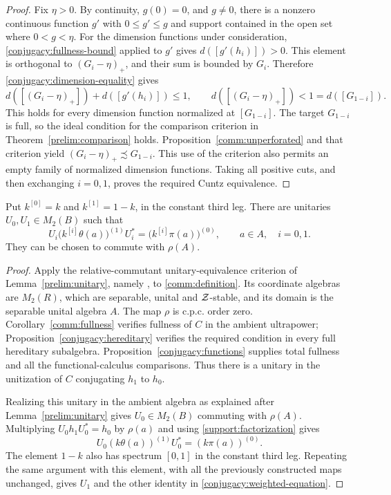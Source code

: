 \begin{proof}
Fix $\eta>0$.  By continuity, $g(0)=0$, and $g\ne0$, there is
a nonzero continuous function $g'$ with $0\leq g'\leq g$ and
support contained in the open set where $0<g<\eta$.
For the dimension functions under consideration,
\eqref{conjugacy:fullness-bound} applied to $g'$ gives
$d([g'(h_i)])>0$.  This element is orthogonal to
$(G_i-\eta)_+$, and their sum is bounded by $G_i$.
Therefore \eqref{conjugacy:dimension-equality} gives
\[
 d([(G_i-\eta)_+])+d([g'(h_i)])\leq1,
 \qquad
 d([(G_i-\eta)_+])<1=d([G_{1-i}]).
\]
This holds for every dimension function normalized at
$[G_{1-i}]$.  The target $G_{1-i}$ is full, so the ideal condition
for the comparison criterion in Theorem~\ref{prelim:comparison} holds.
Proposition~\ref{comm:unperforated} and that criterion yield
$(G_i-\eta)_+\precsim G_{1-i}$.  This use of the criterion
also permits an empty family of normalized dimension functions.
Taking all positive cuts, and then exchanging $i=0,1$, proves
the required Cuntz equivalence.
\end{proof}

\begin{proposition}\label{conjugacy:weighted}
Put $k^{[0]}=k$ and $k^{[1]}=1-k$, in the constant third leg.
There are unitaries $U_0,U_1\in M_2(B)$ such that
\begin{equation}\label{conjugacy:weighted-equation}
 U_i\bigl(k^{[i]}\theta(a)\bigr)^{(1)}U_i^*
   =\bigl(k^{[i]}\pi(a)\bigr)^{(0)},
 \qquad a\in A,\quad i=0,1.
\end{equation}
They can be chosen to commute with $\rho(A)$.
\end{proposition}

\begin{proof}
Apply the relative-commutant unitary-equivalence criterion of
Lemma~\ref{prelim:unitary}, namely \cite[Lemma~5.3]{BBSTWW}, to
\eqref{comm:definition}.  Its coordinate algebras are $M_2(R)$,
which are separable, unital and $\mathcal Z$-stable, and its domain is the
separable unital algebra $A$.  The map $\rho$ is c.p.c. order
zero.  Corollary~\ref{comm:fullness} verifies fullness of $C$ in
the ambient ultrapower; Proposition~\ref{conjugacy:hereditary}
verifies the required condition in every full hereditary
subalgebra.  Proposition~\ref{conjugacy:functions} supplies total
fullness and all the functional-calculus comparisons.  Thus there
is a unitary in the unitization of $C$ conjugating $h_1$ to $h_0$.

Realizing this unitary in the ambient algebra as explained after
Lemma~\ref{prelim:unitary} gives $U_0\in M_2(B)$ commuting with
$\rho(A)$. Multiplying
$U_0h_1U_0^*=h_0$ by $\rho(a)$ and using
\eqref{support:factorization} gives
\[
 U_0(k\theta(a))^{(1)}U_0^*=(k\pi(a))^{(0)}.
\]
The element $1-k$ also has spectrum $[0,1]$ in the constant
third leg.  Repeating the same argument with this element, with
all the previously constructed maps unchanged, gives $U_1$ and
the other identity in \eqref{conjugacy:weighted-equation}.
\end{proof}

